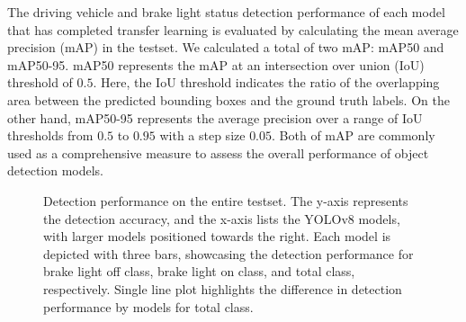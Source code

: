 The driving vehicle and brake light status detection performance of each model that has completed transfer learning is evaluated by calculating the mean average precision (mAP) in the testset.
We calculated a total of two mAP: mAP50 and mAP50-95.
mAP50 represents the mAP at an intersection over union (IoU) threshold of $0.5$. Here, the IoU threshold indicates the ratio of the overlapping area between the predicted bounding boxes and the ground truth labels.
On the other hand, mAP50-95 represents the average precision over a range of IoU thresholds from $0.5$ to $0.95$ with a step size $0.05$. 
Both of mAP are commonly used as a comprehensive measure to assess the overall performance of object detection models.

\begin{figure}[t]%


\caption{Detection performance on the entire testset. The y-axis represents the detection accuracy, and the x-axis lists the YOLOv8 models, with larger models positioned towards the right. Each model is depicted with three bars, showcasing the detection performance for brake light off class, brake light on class, and total class, respectively. Single line plot highlights the difference in detection performance by models for total class.}
\label{fig:test_results}%
\end{figure}

